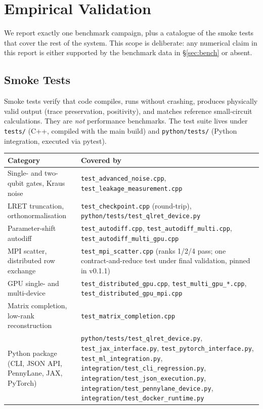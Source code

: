 \documentclass[11pt,a4paper]{article}
\begin{document}
\section{Empirical Validation}
\label{sec:empirical}

We report exactly one benchmark campaign, plus a catalogue of the smoke tests that
cover the rest of the system. This scope is deliberate: any numerical claim in this
report is either supported by the benchmark data in \S\ref{sec:bench} or absent.

\subsection{Smoke Tests}
\label{sec:smoke}

Smoke tests verify that code compiles, runs without crashing, produces physically
valid output (trace preservation, positivity), and matches reference small-circuit
calculations. They are \emph{not} performance benchmarks. The test suite lives under
\texttt{tests/} (C++, compiled with the main build) and \texttt{python/tests/} (Python
integration, executed via pytest).

\begin{center}
\renewcommand{\arraystretch}{1.25}
\begin{tabular}{@{}lp{8.5cm}@{}}
\toprule
\textbf{Category} & \textbf{Covered by} \\
\midrule
Single- and two-qubit gates, Kraus noise &
  \nolinkurl{test_advanced_noise.cpp}, \nolinkurl{test_leakage_measurement.cpp} \\
LRET truncation, orthonormalisation &
  \nolinkurl{test_checkpoint.cpp} (round-trip),
  \nolinkurl{python/tests/test_qlret_device.py} \\
Parameter-shift autodiff &
  \nolinkurl{test_autodiff.cpp}, \nolinkurl{test_autodiff_multi.cpp},
  \nolinkurl{test_autodiff_multi_gpu.cpp} \\
MPI scatter, distributed row exchange &
  \texttt{test\_mpi\_scatter.cpp} (ranks 1/2/4 pass; one contract-and-reduce
  test under final validation, pinned in v0.1.1) \\
GPU single- and multi-device &
  \nolinkurl{test_distributed_gpu.cpp}, \nolinkurl{test_multi_gpu_*.cpp},
  \nolinkurl{test_distributed_gpu_mpi.cpp} \\
Matrix completion, low-rank reconstruction &
  \texttt{test\_matrix\_completion.cpp} \\
Python package (CLI, JSON API, PennyLane, JAX, PyTorch) &
  \nolinkurl{python/tests/test_qlret_device.py},
  \nolinkurl{test_jax_interface.py},
  \nolinkurl{test_pytorch_interface.py},
  \nolinkurl{test_ml_integration.py},
  \nolinkurl{integration/test_cli_regression.py},
  \nolinkurl{integration/test_json_execution.py},
  \nolinkurl{integration/test_pennylane_device.py},
  \nolinkurl{integration/test_docker_runtime.py} \\
\bottomrule
\end{tabular}
\end{center}
\end{document}

